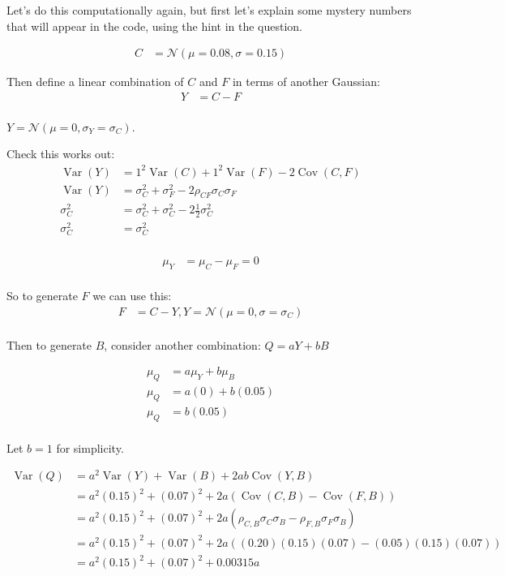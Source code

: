 \begin{enumerate}[label=\textbf{\Alph*}.]
    Let's do this computationally again, but first let's explain some mystery numbers that will appear in the code, using the hint in the question.

    \begin{align*}
        C &= \mathcal{N}(\mu = 0.08, \sigma = 0.15)
    \end{align*}

    Then define a linear combination of $C$ and $F$ in terms of another Gaussian:
    \begin{align*}
        Y &= C - F \\
    \end{align*}

    $Y = \mathcal{N}(\mu=0, \sigma_Y=\sigma_C)$.

    Check this works out:
    \begin{align*}
        \operatorname{Var}(Y) &= 1^2 \operatorname{Var}(C) + 1^2 \operatorname{Var}(F) - 2\operatorname{Cov}(C,F) \\
        \operatorname{Var}(Y) &= \sigma_C^2 + \sigma_F^2 - 2\rho_{CF}\sigma_C\sigma_F \\
        \sigma_C^2 &= \sigma_C^2 + \sigma_C^2 - 2\frac{1}{2}\sigma_C^2 \\
        \sigma_C^2 &= \sigma_C^2 \\
    \end{align*}

    \begin{align*}
        \mu_Y &= \mu_C - \mu_F = 0 \\
    \end{align*}

    So to generate $F$ we can use this:
    \begin{align*}
        F &= C - Y, Y = \mathcal{N}(\mu=0, \sigma=\sigma_C) \\
    \end{align*}

    Then to generate $B$, consider another combination: $Q = aY + bB$

    \begin{align*}
        \mu_Q &= a\mu_Y + b\mu_B \\
        \mu_Q &= a(0) + b(0.05) \\
        \mu_Q &= b(0.05) \\
    \end{align*}

    Let $b=1$ for simplicity.

    \begin{align*}
        \operatorname{Var}(Q) &= a^2 \operatorname{Var}(Y) + \operatorname{Var}(B) + 2ab\operatorname{Cov}(Y,B) \\
        &= a^2 (0.15)^2 + (0.07)^2 + 2a(\operatorname{Cov}(C,B) - \operatorname{Cov}(F,B)) \\
        &= a^2 (0.15)^2 + (0.07)^2 + 2a(\rho_{C,B}\sigma_C\sigma_B - \rho_{F,B}\sigma_F\sigma_B) \\
        &= a^2 (0.15)^2 + (0.07)^2 + 2a((0.20)(0.15)(0.07)- (0.05)(0.15)(0.07)) \\
        &= a^2 (0.15)^2 + (0.07)^2 + 0.00315 a \\
    \end{align*}


\end{enumerate}

